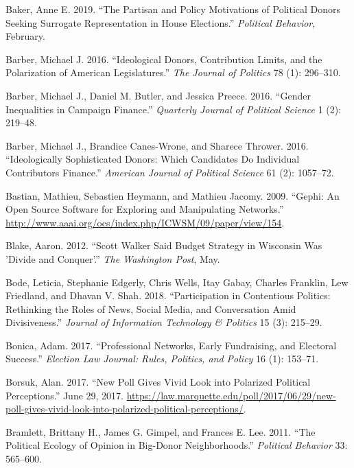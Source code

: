 \documentclass[12pt,]{article}
\begin{document}
\leavevmode\hypertarget{ref-baker2019}{}%
Baker, Anne E. 2019. ``The Partisan and Policy Motivations of Political
Donors Seeking Surrogate Representation in House Elections.''
\emph{Political Behavior}, February.

\leavevmode\hypertarget{ref-barber2016a}{}%
Barber, Michael J. 2016. ``Ideological Donors, Contribution Limits, and
the Polarization of American Legislatures.'' \emph{The Journal of
Politics} 78 (1): 296--310.

\leavevmode\hypertarget{ref-barber2016b}{}%
Barber, Michael J., Daniel M. Butler, and Jessica Preece. 2016. ``Gender
Inequalities in Campaign Finance.'' \emph{Quarterly Journal of Political
Science} 1 (2): 219--48.

\leavevmode\hypertarget{ref-barber2016c}{}%
Barber, Michael J., Brandice Canes-Wrone, and Sharece Thrower. 2016.
``Ideologically Sophisticated Donors: Which Candidates Do Individual
Contributors Finance.'' \emph{American Journal of Political Science} 61
(2): 1057--72.

\leavevmode\hypertarget{ref-gephi}{}%
Bastian, Mathieu, Sebastien Heymann, and Mathieu Jacomy. 2009. ``Gephi:
An Open Source Software for Exploring and Manipulating Networks.''
\url{http://www.aaai.org/ocs/index.php/ICWSM/09/paper/view/154}.

\leavevmode\hypertarget{ref-blake2012}{}%
Blake, Aaron. 2012. ``Scott Walker Said Budget Strategy in Wisconsin Was
'Divide and Conquer'.'' \emph{The Washington Post}, May.

\leavevmode\hypertarget{ref-bode2018}{}%
Bode, Leticia, Stephanie Edgerly, Chris Wells, Itay Gabay, Charles
Franklin, Lew Friedland, and Dhavan V. Shah. 2018. ``Participation in
Contentious Politics: Rethinking the Roles of News, Social Media, and
Conversation Amid Divisiveness.'' \emph{Journal of Information
Technology \& Politics} 15 (3): 215--29.

\leavevmode\hypertarget{ref-bonica2017}{}%
Bonica, Adam. 2017. ``Professional Networks, Early Fundraising, and
Electoral Success.'' \emph{Election Law Journal: Rules, Politics, and
Policy} 16 (1): 153--71.

\leavevmode\hypertarget{ref-borsuk2017}{}%
Borsuk, Alan. 2017. ``New Poll Gives Vivid Look into Polarized Political
Perceptions.'' June 29, 2017.
\url{https://law.marquette.edu/poll/2017/06/29/new-poll-gives-vivid-look-into-polarized-political-perceptions/}.

\leavevmode\hypertarget{ref-bramlett2011}{}%
Bramlett, Brittany H., James G. Gimpel, and Frances E. Lee. 2011. ``The
Political Ecology of Opinion in Big-Donor Neighborhoods.''
\emph{Political Behavior} 33: 565--600.
\end{document}
